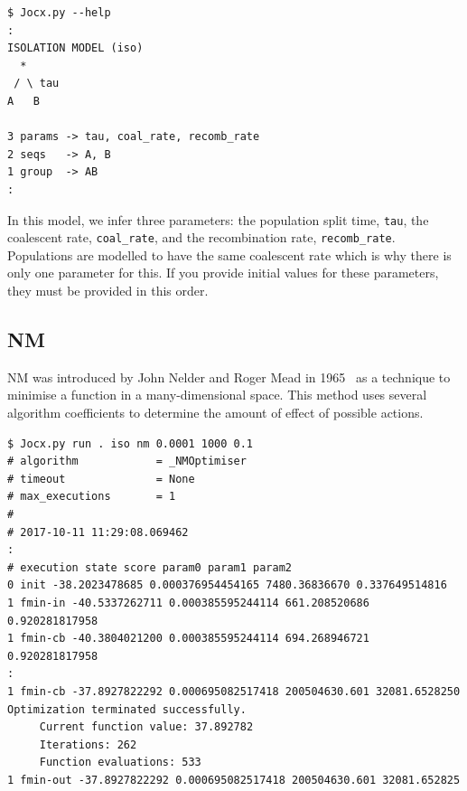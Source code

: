 \documentclass[graybox]{svmult}
\begin{document}
 {\scriptsize{}\begin{verbatim}
$ Jocx.py --help
:
ISOLATION MODEL (iso)
  *
 / \ tau
A   B

3 params -> tau, coal_rate, recomb_rate
2 seqs   -> A, B
1 group  -> AB
:
\end{verbatim}}

In this model, we infer three parameters: the population split time, \texttt{tau}, the coalescent rate, \texttt{coal\_rate}, and the recombination rate, \texttt{recomb\_rate}. Populations are modelled to have the same coalescent rate which is why there is only one parameter for this. If you provide initial values for these parameters, they must be provided in this order.

\subsection{NM}

NM was introduced by John Nelder and Roger Mead in 1965 \cite{nelder1965simplex} \  as a technique to minimise a function in a many-dimensional space. This method uses several algorithm coefficients to determine the amount of effect of possible actions.



 {\scriptsize{}\begin{verbatim}
$ Jocx.py run . iso nm 0.0001 1000 0.1
# algorithm            = _NMOptimiser
# timeout              = None
# max_executions       = 1
#
# 2017-10-11 11:29:08.069462
:
# execution state score param0 param1 param2
0 init -38.2023478685 0.000376954454165 7480.36836670 0.337649514816
1 fmin-in -40.5337262711 0.000385595244114 661.208520686 0.920281817958
1 fmin-cb -40.3804021200 0.000385595244114 694.268946721 0.920281817958
:
1 fmin-cb -37.8927822292 0.000695082517418 200504630.601 32081.6528250
Optimization terminated successfully.
     Current function value: 37.892782
     Iterations: 262
     Function evaluations: 533
1 fmin-out -37.8927822292 0.000695082517418 200504630.601 32081.652825
\end{verbatim}}
\end{document}
